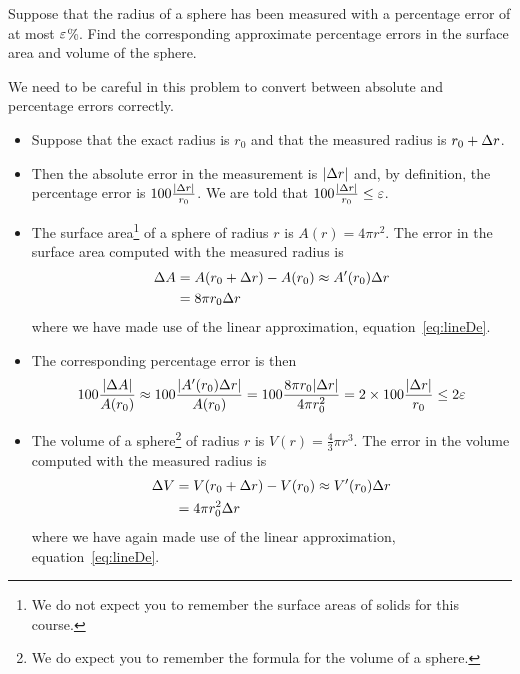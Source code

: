 \begin{eg}\label{eg:taylorSphere}
Suppose that the radius of a sphere has been
measured with a percentage error of at most $\varepsilon$\%. Find
the corresponding approximate percentage errors in the surface
area and volume of the sphere.

\soln We need to be careful in this problem to convert between absolute and percentage
errors correctly.

\begin{itemize}
\item Suppose that the exact radius is $r_0$ and that the measured radius is $r_0+\Delta r$.
\item Then the absolute error in the measurement is $|\Delta r|$ and, by definition, the
percentage error is $100\tfrac{|\Delta r|}{r_0}$. We are told that $100\tfrac{|\Delta
r|}{r_0}\le\varepsilon$.

\item The surface area\footnote{We do not expect you to remember the surface areas of
solids for this course.} of a sphere of radius $r$ is $A(r)=4\pi r^2$. The error
in the surface area computed with the measured radius is
\begin{align*}
\Delta A &=A(r_0+\Delta r)-A(r_0)\approx A'(r_0)\Delta r\\
&= 8\pi r_0 \Delta r
\end{align*}
where we have made use of the linear approximation, equation~\eqref{eq:lineDe}.

\item The corresponding percentage error is then
\begin{align*}
100\frac{|\Delta A|}{A(r_0)}
\approx 100\frac{|A'(r_0)\Delta r|}{A(r_0)}
= 100\frac{8\pi r_0|\Delta r|}{4\pi r_0^2}
= 2\times 100\frac{|\Delta r|}{r_0}
\le 2\varepsilon
\end{align*}


\item The volume of a sphere\footnote{We do expect you to remember the formula for the
volume of a sphere.} of radius $r$ is $V(r)=\frac{4}{3}\pi r^3$. The error in the volume
computed with the measured radius is
\begin{align*}
\Delta V &=V(r_0+\Delta r)-V(r_0)\approx V'(r_0)\Delta r \\
  &= 4\pi r_0^2 \Delta r
\end{align*}
where we have again made use of the linear approximation, equation~\eqref{eq:lineDe}.


\end{itemize}
\end{eg}

